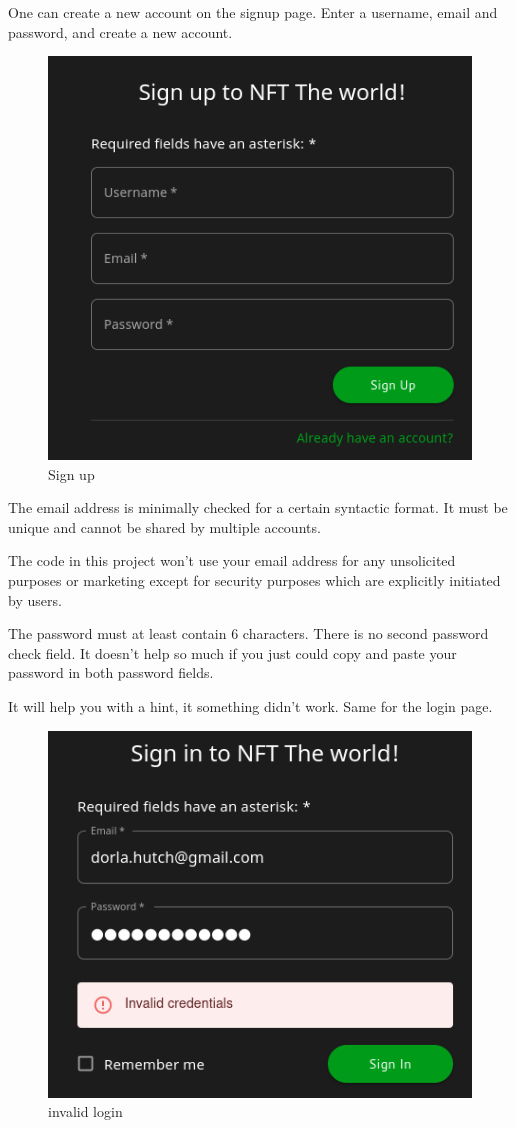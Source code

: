 \documentclass[
]{article}
\begin{document}
One can create a new account on the signup page. Enter a username, email
and password, and create a new account.

\begin{figure}
\centering
\includegraphics{images/Sign_up_page.png}
\caption{Sign up}
\end{figure}\newpage

The email address is minimally checked for a certain syntactic format.
It must be unique and cannot be shared by multiple accounts.

The code in this project won't use your email address for any
unsolicited purposes or marketing except for security purposes which are
explicitly initiated by users.

The password must at least contain 6 characters. There is no second
password check field. It doesn't help so much if you just could copy and
paste your password in both password fields.

It will help you with a hint, it something didn't work. Same for the
login page.

\begin{figure}
\centering
\includegraphics{images/invalid_login.png}
\caption{invalid login}
\end{figure}\newpage
\end{document}
